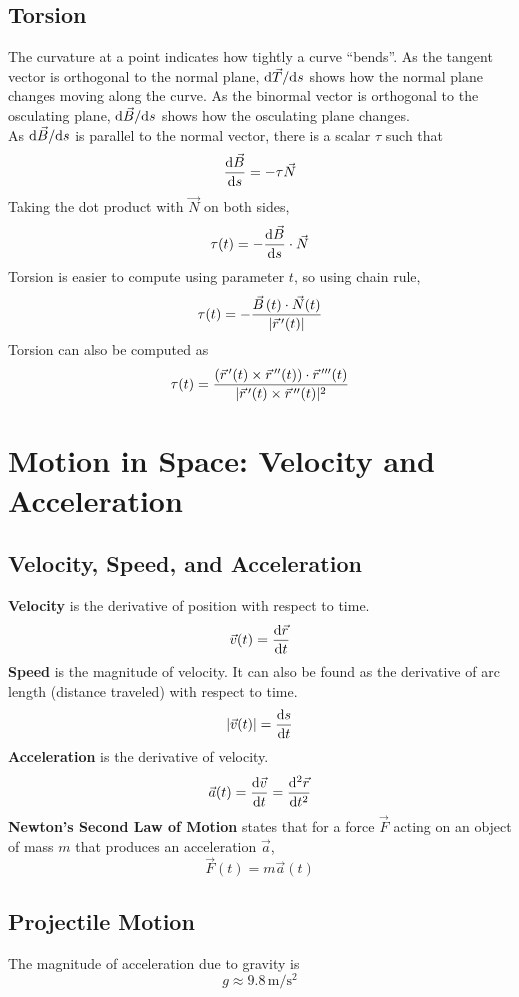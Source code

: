 \documentclass[../Calculus_\Roman{3}]{subfiles}
\begin{document}
			\subsection*{Torsion}
				The curvature at a point indicates how tightly a curve \enquote{bends}. As the tangent vector is orthogonal to the normal plane, $\mathrm{d}\vec{T}/\mathrm{d} s$ shows how the normal plane changes moving along the curve. As the binormal vector is orthogonal to the osculating plane, $\mathrm{d}\vec{B}/\mathrm{d} s$ shows how the osculating plane changes. \\
				As $\mathrm{d}\vec{B}/\mathrm{d} s$ is parallel to the normal vector, there is a scalar $\tau$ such that
					\[\frac{\mathrm{d} \vec{B}}{\mathrm{d} s} = -\tau\vec{N}\]
				Taking the dot product with $\vec{N}$ on both sides,
					\[\tau(t) = -\frac{\mathrm{d} \vec{B}}{\mathrm{d} s} \cdot \vec{N}\]
				Torsion is easier to compute using parameter $t$, so using chain rule, 
					\[\tau(t) = -\frac{\vec{B}\hspace{0.5mm}(t) \cdot \vec{N}(t)}{|\vec{r}\hspace{0.5mm}'(t)|}\]
				Torsion can also be computed as
					\[\tau(t) = \frac{(\vec{r}\hspace{0.5mm}'(t) \times \vec{r}\hspace{0.5mm}''(t)) \cdot \vec{r}\hspace{0.5mm}'''(t)}{|\vec{r}\hspace{0.5mm}'(t) \times \vec{r}\hspace{0.5mm}''(t)|^2}\]
		\section{Motion in Space: Velocity and Acceleration}
			\subsection*{Velocity, Speed, and Acceleration}
				\textbf{Velocity} is the derivative of position with respect to time.
					\[\vec{v}(t) = \frac{\mathrm{d} \vec{r}}{\mathrm{d} t}\]
				\textbf{Speed} is the magnitude of velocity. It can also be found as the derivative of arc length (distance traveled) with respect to time.
					\[|\vec{v}(t)| = \frac{\mathrm{d} s}{\mathrm{d} t}\]
				\textbf{Acceleration} is the derivative of velocity.
					\[\vec{a}(t) = \frac{\mathrm{d} \vec{v}}{\mathrm{d} t} = \frac{\mathrm{d} ^2\vec{r}}{\mathrm{d} t^2}\]
				\textbf{Newton's Second Law of Motion} states that for a force $\vec{F}$ acting on an object of mass $m$ that produces an acceleration $\vec{a}$,
					\[\vec{F}(t) = m\vec{a}(t)\]
			\subsection*{Projectile Motion}
					The magnitude of acceleration due to gravity is
						\[g \approx 9.8\,\mathrm{m/s^2}\]
\end{document}
